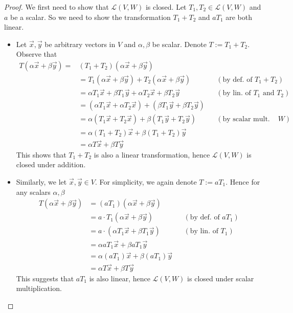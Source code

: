 \begin{proof}
  We first need to show that $\mathcal{L}(V,W)$ is closed.
  Let $T_1, T_2\in\mathcal{L}(V,W)$ and $a$ be a scalar.
  So we need to show the transformation $T_1+T_2$ and $a T_1$ 
  are both linear. 
  \begin{itemize}
    \item Let $\vec{x}, \vec{y}$ be arbitrary vectors in $V$ 
      and $\alpha,\beta$ be scalar. 
      Denote $T:=T_1+T_2$. Observe that 
      \begin{align*}
        T(\alpha\vec{x}+\beta\vec{y})
        =&(T_1+T_2)(\alpha\vec{x}+\beta\vec{y})\\
        &=T_1(\alpha\vec{x}+\beta\vec{y})+T_2(\alpha\vec{x}+\beta\vec{y}) && (\text{by def. of $T_1+T_2$})\\
        &=\alpha T_1\vec{x}+\beta T_1\vec{y}+\alpha T_2\vec{x}+\beta T_2\vec{y} && (\text{by lin. of $T_1$ and $T_2$})\\
        &=(\alpha T_1\vec{x}+\alpha T_2\vec{x}) + (\beta T_1\vec{y}+\beta T_2\vec{y})\\
        &=\alpha (T_1\vec{x}+T_2\vec{x}) + \beta (T_1\vec{y}+T_2\vec{y}) && (\text{by scalar mult. in $W$})\\
        &=\alpha (T_1+T_2)\vec{x}+\beta (T_1+T_2)\vec{y}\\
        &=\alpha T\vec{x}+\beta T\vec{y}
      \end{align*}
      This shows that $T_1+T_2$ is also a linear transformation, hence 
      $\mathcal{L}(V,W)$ is closed under addition.
    \item Similarly, we let $\vec{x},\vec{y}\in V$. For simplicity, we again 
      denote $T:=a T_1$. Hence for any scalars $\alpha, \beta$
      \begin{align*}
        T(\alpha\vec{x}+\beta\vec{y})
        &=(aT_1)(\alpha\vec{x}+\beta\vec{y})\\
        &=a\cdot T_1(\alpha\vec{x}+\beta\vec{y}) && (\text{by def. of $aT_1$})\\
        &=a\cdot (\alpha T_1\vec{x}+\beta T_1\vec{y}) && (\text{by lin. of $T_1$})\\
        &=\alpha aT_1\vec{x}+\beta aT_1\vec{y}\\
        &=\alpha (aT_1)\vec{x}+\beta (aT_1){\vec{y}}\\
        &=\alpha T\vec{x}+\beta T\vec{y}
      \end{align*}
      This suggests that $aT_1$ is also linear, hence $\mathcal{L}(V,W)$
      is closed under scalar multiplication.

\end{itemize}
\end{proof}
